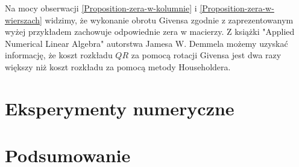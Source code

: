 \documentclass[12pt,a4paper]{report}
\newcommand{\mx}[1]{{#1}}
\begin{document}
Na mocy obserwacji \ref{Proposition-zera-w-kolumnie} i \ref{Proposition-zera-w-wierszach} widzimy, że wykonanie obrotu Givensa zgodnie z zaprezentowanym wyżej przykładem zachowuje odpowiednie zera w macierzy.
Z książki "Applied Numerical Linear Algebra" autorstwa Jamesa W. Demmela możemy uzyskać informację, że koszt  rozkładu $\mx{QR}$ za pomocą rotacji Givensa jest dwa razy większy niż koszt rozkładu za pomocą metody Householdera.






\chapter{Eksperymenty numeryczne}

\chapter{Podsumowanie}




\end{document}
